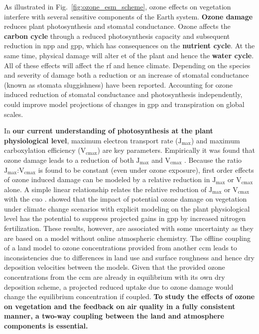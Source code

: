 As illustrated in Fig.~\ref{fig:ozone_esm_scheme}, ozone effects on vegetation interfere with several sensitive components of the Earth system. \textbf{\color{red}Ozone damage} reduces plant photosynthesis and stomatal conductance. Ozone affects the \textbf{\color{darkgray}carbon cycle} through a reduced photosynthesis capacity and subsequent reduction in \gls{npp} and \gls{gpp}, which has consequences on the \textbf{\color{darkgray}nutrient cycle}. At the same time, physical damage will alter \gls{et} of the plant and hence the \textbf{\color{blue}water cycle}. All of these effects will affect the \gls{rf} and hence climate. Depending on the species and severity of damage both a reduction \parencite{Oe:Lombardozzi2012} or an increase of stomatal conductance (known as stomata sluggishness) \parencite{SR:Hoshika2015} have been reported. Accounting for ozone induced reduction of stomatal conductance and photosynthesis independently, \textcite{BGS:Lombardozzi2012} could improve model projections of changes in \gls{gpp} and transpiration on global scales.

In \textbf{our current understanding of photosynthesis at the plant physiological level}, maximum electron transport rate ($\mathrm{J_{max}}$) and maximum carboxylation efficiency ($\mathrm{V_{cmax}}$) are key parameters. Empirically it was found that ozone damage leads to a reduction of both $\mathrm{J_{max}}$ and $\mathrm{V_{cmax}}$ \parencite{EJA:Emberson2018}. Because the ratio $\mathrm{J_{max}}$:$\mathrm{V_{cmax}}$ is found to be constant (even under ozone exposure), first order effects of ozone induced damage can be modeled by a relative reduction in $\mathrm{J_{max}}$ or $\mathrm{V_{cmax}}$ alone. A simple linear relationship relates the relative reduction of $\mathrm{J_{max}}$ or $\mathrm{V_{cmax}}$ with the \gls{cuo} \parencites{BGS:Franz2017}{BGS:Franz2018}. \textcite{BGSD:Franz2020} showed that the impact of potential ozone damage on vegetation under climate change scenarios with explicit modeling on the plant physiological level has the potential to suppress projected gains in \gls{gpp} by increased nitrogen fertilization. These results, however, are associated with some uncertainty as they are based on a model without online atmospheric chemistry. The offline coupling of a land model to ozone concentrations provided from another \gls{ccm} leads to inconsistencies due to differences in land use and surface roughness and hence dry deposition velocities between the models. Given that the provided ozone concentrations from the \gls{ccm} are already in equilibrium with its own dry deposition scheme, a projected reduced uptake due to ozone damage would change the equilibrium concentration if coupled. \textbf{To study the effects of ozone on vegetation and the feedback on air quality in a fully consistent manner, a two-way coupling between the land and atmosphere components is essential.}\\

